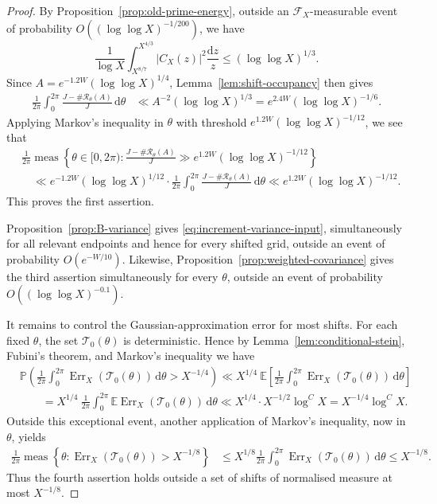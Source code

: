 \documentclass[10pt,a4paper]{amsart}
\newcommand{\E}{\mathbb{E}}
\newcommand{\p}{\mathbb{P}}
\begin{document}
\begin{proof}
By Proposition~\ref{prop:old-prime-energy}, outside an
\(\mathscr F_X\)-measurable event of probability
\(O((\log\log X)^{-1/200})\), we have
\[
 \frac1{\log X}\int_{X^{8/7}}^{X^{4/3}}
 |C_X(z)|^2\frac{\mathrm{d}z}{z}
 \leq(\log\log X)^{1/3}.
\]
Since \(A=e^{-1.2W}(\log\log X)^{1/4}\),
Lemma~\ref{lem:shift-occupancy} then gives
\[
 \begin{aligned}
 \frac1{2\pi}\int_0^{2\pi}
 \frac{J-\#\mathcal R_\theta(A)}{J}\,\mathrm{d}\theta
 &\ll
 A^{-2}(\log\log X)^{1/3}=
 e^{2.4W}(\log\log X)^{-1/6}.
 \end{aligned}
\]
Applying Markov's inequality in \(\theta\) with threshold
\(e^{1.2W}(\log\log X)^{-1/12}\), we see that
\[
 \begin{aligned}
 &\frac1{2\pi}\operatorname{meas}\left\{
 \theta\in[0,2\pi):
 \frac{J-\#\mathcal R_\theta(A)}{J}
 \gg
  e^{1.2W}(\log\log X)^{-1/12}
 \right\}\\
 &\quad \ll
{
 e^{-1.2W}(\log\log X)^{1/12}
 }
 \cdot
 \frac1{2\pi}\int_0^{2\pi}
 \frac{J-\#\mathcal R_\theta(A)}{J}\,\mathrm{d}\theta
 \ll
 e^{1.2W}(\log\log X)^{-1/12}.
 \end{aligned}
\]
This proves the first assertion.

Proposition~\ref{prop:B-variance} gives
\eqref{eq:increment-variance-input}, simultaneously for all relevant
endpoints and hence for every shifted grid, outside an event of probability
\(O(e^{-W/10})\). Likewise,
Proposition~\ref{prop:weighted-covariance} gives the third assertion
simultaneously for every \(\theta\), outside an event of probability
\(O((\log\log X)^{-0.1})\).

It remains to control the Gaussian-approximation error for most shifts.
For each fixed \(\theta\), the set \(\mathcal T_0(\theta)\) is deterministic.
Hence by Lemma~\ref{lem:conditional-stein}, Fubini's theorem, and Markov's
inequality we have
\[
 \begin{aligned}
&\p\left(
 \frac1{2\pi}\int_0^{2\pi}
 \operatorname{Err}_X(\mathcal T_0(\theta))\,\mathrm{d}\theta
 >X^{-1/4}
 \right)
 \ll 
 X^{1/4}\ \E\left[
 \frac1{2\pi}\int_0^{2\pi}
 \operatorname{Err}_X(\mathcal T_0(\theta))\,\mathrm{d}\theta
 \right]\\
 &\qquad=
 X^{1/4}\ \frac1{2\pi}\int_0^{2\pi}
 \E\operatorname{Err}_X(\mathcal T_0(\theta))\,\mathrm{d}\theta
 \ll 
 X^{1/4}\cdot X^{-1/2}\log^C X
 =
 X^{-1/4}\log^C X.
 \end{aligned}
\]
Outside this exceptional event, another application of Markov's inequality,
now in \(\theta\), yields
\[
 \begin{aligned}
 \frac1{2\pi}\operatorname{meas}\left\{
 \theta:
 \operatorname{Err}_X(\mathcal T_0(\theta))>X^{-1/8}
 \right\}
 &\leq
 X^{1/8}
 \frac1{2\pi}\int_0^{2\pi}
 \operatorname{Err}_X(\mathcal T_0(\theta))\,\mathrm{d}\theta\leq X^{-1/8}.
 \end{aligned}
\]
Thus the fourth assertion holds outside a set of shifts of normalised
measure at most \(X^{-1/8}\).


\end{proof}
\end{document}
